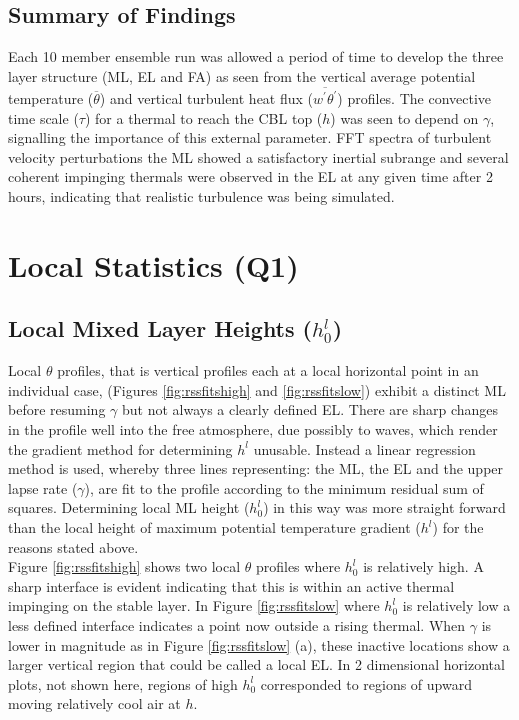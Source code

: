 \subsection{Summary of Findings}

Each 10 member ensemble run was allowed a period of time to develop the three layer structure (\acs{ML}, \acs{EL}
and \acs{FA}) as seen from the vertical average potential temperature ($\overline{\theta}$) and vertical 
turbulent heat flux ($\overline{w^{'}\theta^{'}}$) profiles. The convective time scale ($\tau$) for a thermal 
to reach the \acs{CBL} top ($h$) was seen to depend on $\gamma$, signalling the importance of this external parameter. 
\acs{FFT} spectra of turbulent velocity perturbations the \acs{ML} showed a satisfactory inertial subrange and several coherent 
impinging thermals were observed in the \acs{EL} at any given time after 2 hours, indicating that 
realistic turbulence was being simulated.\\

\clearpage

\section{Local Statistics (Q1)}
\label{sec:q1}

\subsection{Local Mixed Layer Heights ($h_{0}^{l}$)}
\label{subsec:locmlh}     
\FloatBarrier

Local $\theta$ profiles, that is vertical profiles each at a local horizontal point in an individual case,
 (Figures \ref{fig:rssfitshigh} and \ref{fig:rssfitslow}) exhibit a distinct 
\acs{ML} before resuming $\gamma$ but not always a clearly defined \acs{EL}.  There are sharp changes in the profile well into the free 
atmosphere, due possibly to waves, which render the gradient method for determining $h^{l}$ 
unusable.  Instead a linear regression method is used, whereby three lines representing: the
 \acs{ML}, the \acs{EL} and the upper lapse rate ($\gamma$), are fit to the profile according 
to the minimum residual sum of squares.  Determining local \acs{ML} height ($h_{0}^{l}$) in this way was 
more straight forward than the local height of maximum potential temperature gradient 
($h^{l}$) for the reasons stated above.\\  

Figure \ref{fig:rssfitshigh} shows two local $\theta$ profiles where $h_{0}^{l}$ is relatively high.  
A sharp interface is evident indicating that this is within an active thermal impinging on the stable layer.
In Figure \ref{fig:rssfitslow} where $h_{0}^{l}$ is relatively low a less defined interface indicates 
a point now outside a rising thermal.  When $\gamma$ is lower in magnitude as in Figure \ref{fig:rssfitslow} (a), 
these inactive locations show a larger vertical region that could be called a local \acs{EL}.  
In 2 dimensional horizontal plots, not shown here, regions of high 
$h_{0}^{l}$ corresponded to regions of upward moving relatively cool air at $h$.\\

